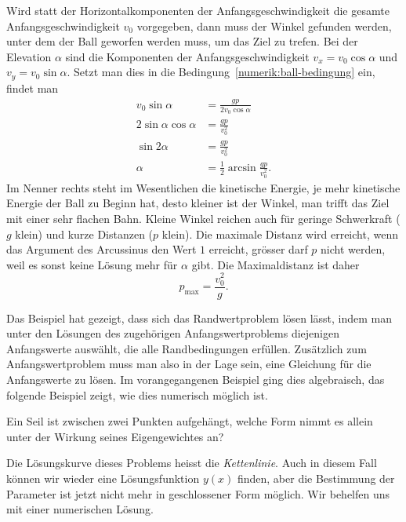 Wird statt der Horizontalkomponenten der Anfangsgeschwindigkeit die
gesamte Anfangsgeschwindigkeit $v_0$ vorgegeben, dann muss der
Winkel gefunden werden, unter dem der Ball geworfen werden muss,
um das Ziel zu trefen.
Bei der Elevation $\alpha$ sind die Komponenten der Anfangsgeschwindigkeit
$v_x=v_0\cos\alpha$ und $v_y=v_0\sin\alpha$. 
Setzt man dies in die Bedingung~\eqref{numerik:ball-bedingung} ein,
findet man
\begin{align*}
v_0 \sin \alpha &=\frac{gp}{2v_0\cos\alpha}
\\
2\sin\alpha\cos\alpha&=\frac{gp}{v_0^2}
\\
\sin2\alpha&=\frac{gp}{v_0^2}
\\
\alpha&= \frac12 \arcsin\frac{gp}{v_0^2}.
\end{align*}
Im Nenner rechts steht im Wesentlichen die kinetische Energie,
je mehr kinetische Energie der Ball zu Beginn hat, desto kleiner
ist der Winkel, man trifft das Ziel mit einer sehr flachen Bahn.
Kleine Winkel reichen auch für geringe Schwerkraft ($g$ klein)
und kurze Distanzen ($p$ klein).
Die maximale Distanz wird erreicht, wenn das Argument des Arcussinus
den Wert $1$ erreicht, grösser darf $p$ nicht werden, weil es sonst
keine Lösung mehr für $\alpha$ gibt.
Die Maximaldistanz ist daher
\[
p_{\text{max}} = \frac{v_0^2}{g}.
\]

Das Beispiel hat gezeigt, dass sich das Randwertproblem lösen lässt,
indem man unter den Lösungen des zugehörigen Anfangswertproblems
diejenigen Anfangswerte auswählt, die alle Randbedingungen erfüllen.
Zusätzlich zum Anfangswertproblem muss man also in der Lage sein,
eine Gleichung für die Anfangswerte zu lösen.
Im vorangegangenen Beispiel ging dies algebraisch, das folgende Beispiel
zeigt, wie dies numerisch möglich ist.

\begin{aufgabe}
\label{numerik:aufgabe-seil}
Ein Seil ist zwischen zwei Punkten aufgehängt, welche Form nimmt es
allein unter der Wirkung seines Eigengewichtes an?
\end{aufgabe}
Die Lösungskurve dieses Problems heisst die {\em Kettenlinie}.
Auch in diesem Fall können wir wieder eine Lösungsfunktion $y(x)$ finden,
aber die Bestimmung der Parameter ist jetzt nicht mehr in geschlossener
Form möglich.
Wir behelfen uns mit einer numerischen Lösung.

